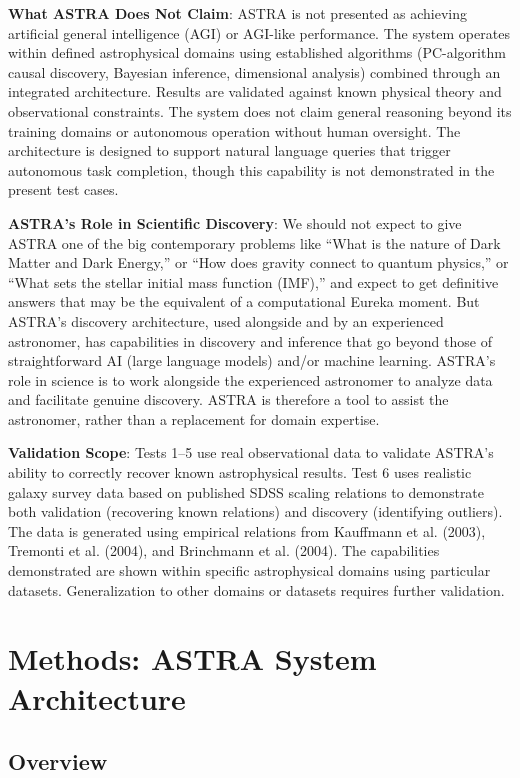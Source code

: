 \documentclass[usenatbib]{rasti}
\begin{document}
\textbf{What ASTRA Does Not Claim}: ASTRA is not presented as achieving artificial general intelligence (AGI) or AGI-like performance. The system operates within defined astrophysical domains using established algorithms (PC-algorithm causal discovery, Bayesian inference, dimensional analysis) combined through an integrated architecture. Results are validated against known physical theory and observational constraints. The system does not claim general reasoning beyond its training domains or autonomous operation without human oversight. The architecture is designed to support natural language queries that trigger autonomous task completion, though this capability is not demonstrated in the present test cases.

\textbf{ASTRA's Role in Scientific Discovery}: We should not expect to give ASTRA one of the big contemporary problems like ``What is the nature of Dark Matter and Dark Energy,'' or ``How does gravity connect to quantum physics,'' or ``What sets the stellar initial mass function (IMF),'' and expect to get definitive answers that may be the equivalent of a computational Eureka moment. But ASTRA's discovery architecture, used alongside and by an experienced astronomer, has capabilities in discovery and inference that go beyond those of straightforward AI (large language models) and/or machine learning. ASTRA's role in science is to work alongside the experienced astronomer to analyze data and facilitate genuine discovery. ASTRA is therefore a tool to assist the astronomer, rather than a replacement for domain expertise.

\textbf{Validation Scope}: Tests 1--5 use real observational data to validate ASTRA's ability to correctly recover known astrophysical results. Test 6 uses realistic galaxy survey data based on published SDSS scaling relations to demonstrate both validation (recovering known relations) and discovery (identifying outliers). The data is generated using empirical relations from Kauffmann et al. (2003), Tremonti et al. (2004), and Brinchmann et al. (2004). The capabilities demonstrated are shown within specific astrophysical domains using particular datasets. Generalization to other domains or datasets requires further validation.

\section{Methods: ASTRA System Architecture}

\subsection{Overview}
\end{document}
